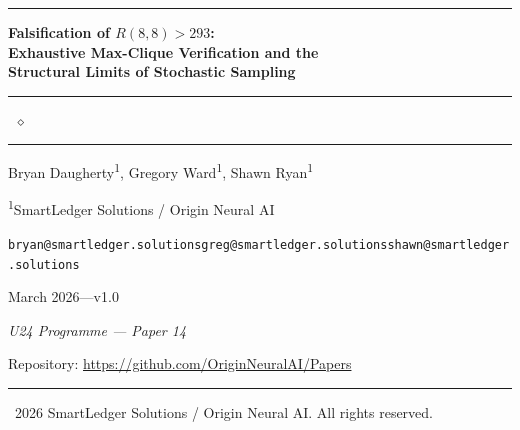 \documentclass[12pt,a4paper]{article}
\theoremstyle{definition}
\theoremstyle{remark}
\begin{document}

\begin{center}

{\color{u24gold}\rule{\textwidth}{0.5pt}}
\vspace{0.8em}

{\LARGE\bfseries\color{u24navy}
Falsification of $R(8,8) > 293$:\\[4pt]
Exhaustive Max-Clique Verification and the\\[4pt]
Structural Limits of Stochastic Sampling}

\vspace{0.8em}
{\color{u24gold}\rule{0.4\textwidth}{0.5pt}~$\diamond$~\rule{0.4\textwidth}{0.5pt}}
\vspace{0.8em}

{\large Bryan Daugherty\textsuperscript{1},\quad
Gregory Ward\textsuperscript{1},\quad
Shawn Ryan\textsuperscript{1}}

\vspace{0.4em}

{\normalsize\textsuperscript{1}SmartLedger Solutions / Origin Neural AI}

\vspace{0.4em}

{\small\texttt{bryan@smartledger.solutions}\quad\texttt{greg@smartledger.solutions}\quad\texttt{shawn@smartledger.solutions}}

\vspace{0.6em}

{\normalsize March 2026\quad---\quad v1.0}

\vspace{0.4em}

\textit{U24 Programme --- Paper 14}

\vspace{0.4em}

{\small\textcolor{u24navy}{Repository:} \url{https://github.com/OriginNeuralAI/Papers}}

\vspace{0.6em}
{\color{u24gold}\rule{\textwidth}{0.5pt}}

\end{center}

\vspace{0.5em}

{\small\textcopyright~2026 SmartLedger Solutions / Origin Neural AI. All rights reserved.}
\end{document}
